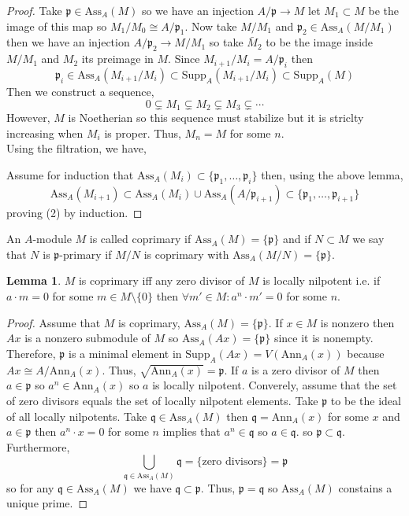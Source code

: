 \documentclass[12pt]{article}
\newcommand{\Ann}[2]{\mathrm{Ann}_{#1}\left(#2\right)}
\newcommand{\Ass}[2]{\mathrm{Ass}_{#1}\left( #2 \right)}
\newcommand{\Supp}[2]{\mathrm{Supp}_{#1}\left(#2 \right)}
\newcommand{\p}{\mathfrak{p}}
\newcommand{\q}{\mathfrak{q}}
\theoremstyle{remark}
\theoremstyle{definition}
\newtheorem{lemma}[theorem]{Lemma}
\newenvironment{definition}[1][Definition:]{\begin{trivlist}
\item[\hskip \labelsep {\bfseries #1}]}{\end{trivlist}}
\begin{document}
\begin{proof}
Take $\p \in \Ass{A}{M}$ so we have an injection $A / \p \to M$ let $M_1 \subset M$ be the image of this map so $M_1 / M_0 \cong A / \p_1$. Now take $M / M_1$ and $\p_2 \in \Ass{A}{M/M_1}$ then we have an injection $A / \p_2 \to M/M_1$ so take $\bar{M}_2$ to be the image inside $M/M_1$ and $M_2$ its preimage in $M$.
Since $M_{i+1}/M_i = A / \p_i$ then 
\[ \p_i \in \Ass{A}{M_{i+1}/M_{i}} \subset \Supp{A}{M_{i+1}/M_i} \subset \Supp{A}{M} \]
Then we construct a sequence,
\[ 0 \subsetneq M_1 \subsetneq M_2 \subsetneq M_3 \subsetneq \cdots \]
However, $M$ is Noetherian so this sequence must stabilize but it is striclty increasing when $M_i$ is proper. Thus, $M_n  = M$ for some $n$. 
\bigskip\\
Using the filtration, we have,
\begin{center}
\end{center}
Assume for induction that $\Ass{A}{M_i} \subset \{\p_1, \dots, \p_i \}$ then, using the above lemma,
\[ \Ass{A}{M_{i+1}} \subset \Ass{A}{M_i} \cup \Ass{A}{A / \p_{i+1}} \subset \{\p_1, \dots, \p_{i+1} \} \]
proving (2) by induction. 
\end{proof}

\begin{definition}
An $A$-module $M$ is called coprimary if $\Ass{A}{M} = \{\p\}$ and if $N \subset M$ we say that $N$ is $\p$-primary if $M / N$ is coprimary with $\Ass{A}{M/N} = \{ \p \}$.  
\end{definition}

\begin{lemma}
$M$ is coprimary iff any zero divisor of $M$ is locally nilpotent i.e. if $a \cdot m = 0$ for some $m \in M \setminus \{0\}$ then $\forall m' \in M : a^n \cdot m' = 0$ for some $n$. 
\end{lemma}

\begin{proof}
Assume that $M$ is coprimary, $\Ass{A}{M} = \{ \p \}$. If $x \in M$ is nonzero then $Ax$ is a nonzero submodule of $M$ so $\Ass{A}{Ax} = \{ \p \}$ since it is nonempty. Therefore, $\p$ is a minimal element in $\Supp{A}{A x} = V(\Ann{A}{x})$
because $Ax \cong A / \Ann{A}{x}$. Thus, $\sqrt{\Ann{A}{x}} = \p$. If $a$ is a zero divisor of $M$ then $a \in \p$ so $a^n \in \Ann{A}{x}$ so $a$ is locally nilpotent. Converely, assume that the set of zero divisors equals the set of locally nilpotent elements. Take $\p$ to be the ideal of all locally nilpotents. Take $\q \in \Ass{A}{M}$ then $\q = \Ann{A}{x}$ for some $x$ and $a \in \p$ then $a^n \cdot x = 0$ for some $n$ implies that $a^n \in \q$ so $a \in \q$. so $\p \subset \q$. Furthermore,
\[ \bigcup_{\q \in \Ass{A}{M}} \q = \{ \text{zero divisors} \} = \p \]
so for any $\q \in \Ass{A}{M}$ we have $\q \subset \p$. Thus, $\p = \q$ so $\Ass{A}{M}$ constains a unique prime.
\end{proof}
\end{document}
